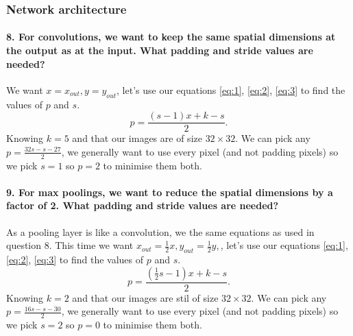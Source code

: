 \documentclass{article}
\theoremstyle{plain}%
\theoremstyle{definition}
\theoremstyle{remark}
\begin{document}
\subsubsection{Network architecture}
\paragraph{8. For convolutions, we want to keep the same spatial dimensions at the output as at the input. What padding and stride values are needed?}
We want $ x = x_{out}, y = y_{out} $, let's use our equations \ref{eq:1}, \ref{eq:2}, \ref{eq:3} to find the values of $p$ and $s$.
\[
    p = \frac{(s-1)x + k - s}{2}
.\]
Knowing $k = 5$ and that our images are of size $32 \times 32 $. We can pick any $p = \frac{32s - s - 27}{2}$, we generally want to use every pixel (and not padding pixels) so we pick $ s = 1 $ so $ p = 2 $ to minimise them both.


\paragraph{9. For max poolings, we want to reduce the spatial dimensions by a factor of 2. What padding and stride values are needed?} 
As a pooling layer is like a convolution, we the same equations as used in question 8. This time we want $ x_{out} = \frac{1}{2}x, y_{out} = \frac{1}{2}y, $, let's use our equations \ref{eq:1}, \ref{eq:2}, \ref{eq:3} to find the values of $p$ and $s$.
\[
    p = \frac{(\frac{1}{2}s - 1) x + k - s}{2}
.\]
Knowing $k = 2$ and that our images are stil of size $32 \times 32 $. We can pick any $p = \frac{16s - s - 30}{2}$, we generally want to use every pixel (and not padding pixels) so we pick $ s = 2 $ so $ p = 0 $ to minimise them both.
\end{document}
